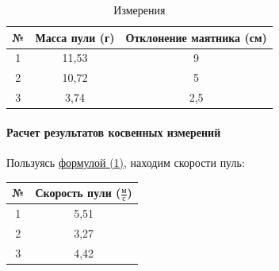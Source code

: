\documentclass{article}
\begin{document}
		\begin{table}[htb]
			\centering
		\caption{Измерения}
		\begin{tabular}{| c | c | c |}
			\hline
			№ & Масса пули (г) & Отклонение маятника (см) \\
			\hline
			1 & 11,53 & 9 \\
			\hline
			2 & 10,72 & 5 \\
			\hline
			3 & 3,74 & 2,5 \\
			\hline
		\end{tabular}
	\end{table}

\paragraph{Расчет результатов косвенных измерений}
Пользуясь \hyperlink{formuls}{формулой (1)}, находим скорости пуль:
\begin{table}[!htb]
	\centering
	
	\begin{tabular}{|c|c|}
		\hline
		№ & Скорость пули ($\frac{\mbox{м}}{\mbox{с}}$) \\
		\hline
		1 &  5,51  \\
		\hline
		2 &  3,27  \\
		\hline
		3 & 4,42  \\
		\hline
	\end{tabular}
\end{table}
\end{document}
